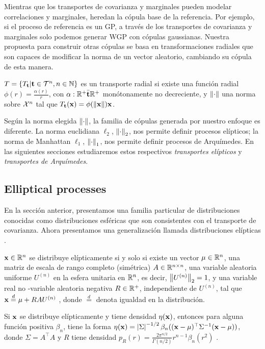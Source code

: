 Mientras que los transportes de covarianza y marginales pueden modelar correlaciones y marginales, heredan la cópula base de la referencia. Por ejemplo, si el proceso de referencia es un GP, a través de los transportes de covarianza y marginales solo podemos generar WGP con cópulas gaussianas. Nuestra propuesta para construir otras cópulas se basa en transformaciones radiales que son capaces de modificar la norma de un vector aleatorio, cambiando su cópula de esta manera.

\begin{definition}
	\(T=\{T_{\mathbf{t}} | \mathbf{t} \in \mathcal{T}^n, n \in \mathbb{N}\}\) es un transporte radial si existe una función radial \(\phi(r) = \frac{\alpha(r)}{r}\), con \(\alpha:\mathbb{R}^{+}\bar{\mathbf{t}}\mathbb{R}^{+}\) monótonamente no decreciente, y \(\left\Vert \cdot \right\Vert\) una norma sobre \(\mathcal{X}^n\) tal que \(T_{\mathbf{t}}(\mathbf{x}) = \phi(\lVert \mathbf{x} \rVert)\mathbf{x}\).
\end{definition}

Según la norma elegida \(\left\Vert \cdot \right\Vert\), la familia de cópulas generada por nuestro enfoque es diferente. La norma euclidiana \(\ell_2\), \(\left\Vert \cdot \right\Vert_2\), nos permite definir procesos elípticos; la norma de Manhattan \(\ell_1\), \(\left\Vert \cdot \right\Vert_1\), nos permite definir procesos de Arquímedes. En las siguientes secciones estudiaremos estos respectivos \emph{transportes elípticos} y \emph{transportes de Arquímedes}.

\subsection{Elliptical processes}

En la sección anterior, presentamos una familia particular de distribuciones conocidas como distribuciones esféricas que son consistentes con el transporte de covarianza. Ahora presentamos una generalización llamada distribuciones elípticas \cite{owen1983class}.

\begin{definition}
	\(\mathbf{x} \in \mathbb{R}^n\) se distribuye elípticamente si y solo si existe un vector \(\mu \in \mathbb{R}^n\), una matriz de escala de rango completo (simétrica) \(A \in \mathbb{R}^{n \times n} \), una variable aleatoria uniforme \(U^{(n)}\) en la esfera unitaria en \(\mathbb{R}^{n}\), es decir, \(\left\Vert U^{(n)} \right\Vert_2 =1\), y una variable real no -variable aleatoria negativa \(R \in \mathbb{R}^+\), independiente de \(U^{(n)}\), tal que \(\mathbf{x} \stackrel{d}{=} \mu + RAU^{(n)}\) , donde \(\stackrel{d}{=}\) denota igualdad en la distribución.
\end{definition}
\begin{remark}
	Si \(\mathbf{x}\) se distribuye elípticamente y tiene densidad \(\eta(\mathbf{x})\), entonces para alguna función positiva \(\beta_n\), tiene la forma \(\eta(\mathbf{x}) = \left\vert \Sigma\right\vert^{ -1/2} \beta_n((\mathbf{x}-\mu)^\top\Sigma^{-1}(\mathbf{x}-\mu))\), donde \(\Sigma = A^{\top}A\) y \( R\) tiene densidad \(p_R(r) = \frac{2\pi^{n/2}}{\Gamma(n/2)}r^{n-1}\beta_n(r^2)\) \cite{ owen1983clase}.	
\end{remark}

